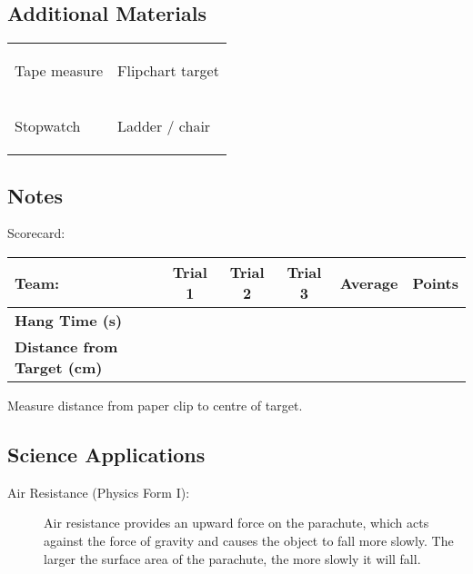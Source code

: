 \subsection{Additional Materials}
\begin{tabular}{p{} p{}} \\[-30pt]
\begin{itemize*}
\item Tape measure		
\end{itemize*}	& \begin{itemize*}
\item Flipchart target
\end{itemize*}\\[-30pt]
\begin{itemize*}
\item Stopwatch	
\end{itemize*}	& \begin{itemize*}
\item Ladder / chair
\end{itemize*}\\[-10pt]
\end{tabular}

\subsection{Notes}
\begin{itemize*}
\item Scorecard:
\end{itemize*}
\begin{tabular}{|l|c|c|c|c|c|} \hline
\textbf{Team:} & \textbf{Trial 1} & \textbf{Trial 2} & \textbf{Trial 3} & \textbf{Average} & \textbf{Points} \\ \hline
\textbf{Hang Time (s)} & & & & & \\ \hline
\textbf{Distance from Target (cm)} & & & & & \\ \hline
\end{tabular}
\begin{itemize*}
\item Measure distance from paper clip to centre of target.
\end{itemize*}

\subsection{Science Applications}
\begin{description}
\item[Air Resistance (Physics Form I):]{Air resistance provides an upward force on the parachute, which acts against the force of gravity and causes the object to fall more slowly. The larger the surface area of the parachute, the more slowly it will fall.}
\end{description}


